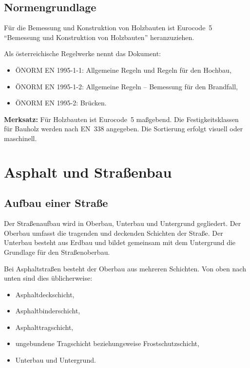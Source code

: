 \documentclass[
  12pt,
  a4paper,
  oneside
]{scrreprt}
\begin{document}
\section{Normengrundlage}

Für die Bemessung und Konstruktion von Holzbauten ist Eurocode~5
``Bemessung und Konstruktion von Holzbauten'' heranzuziehen.


Als österreichische Regelwerke nennt das Dokument:

\begin{itemize}
  \item ÖNORM EN 1995-1-1: Allgemeine Regeln und Regeln für den
  Hochbau,
  \item ÖNORM EN 1995-1-2: Allgemeine Regeln -- Bemessung für den
  Brandfall,
  \item ÖNORM EN 1995-2: Brücken.
\end{itemize}



\begin{merksatzbox}
\textbf{Merksatz:}
Für Holzbauten ist Eurocode~5 maßgebend. Die Festigkeitsklassen für
Bauholz werden nach EN~338 angegeben. Die Sortierung erfolgt visuell
oder maschinell.

\end{merksatzbox}

\chapter{Asphalt und Straßenbau}

\section{Aufbau einer Straße}

Der Straßenaufbau wird in Oberbau, Unterbau und Untergrund gegliedert.
Der Oberbau umfasst die tragenden und deckenden Schichten der Straße.
Der Unterbau besteht aus Erdbau und bildet gemeinsam mit dem Untergrund
die Grundlage für den Straßenoberbau.


Bei Asphaltstraßen besteht der Oberbau aus mehreren Schichten. Von oben
nach unten sind dies üblicherweise:

\begin{itemize}
  \item Asphaltdeckschicht,
  \item Asphaltbinderschicht,
  \item Asphalttragschicht,
  \item ungebundene Tragschicht beziehungsweise Frostschutzschicht,
  \item Unterbau und Untergrund.
\end{itemize}
\end{document}
